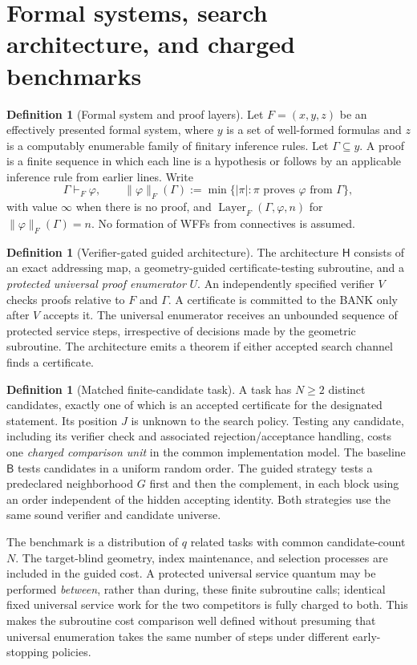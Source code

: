 \documentclass[11pt,letterpaper]{article}
\theoremstyle{definition}
\newtheorem{definition}[theorem]{Definition}
\theoremstyle{remark}
\newcommand{\Layer}{\operatorname{Layer}}
\newcommand{\Hsys}{\mathsf H}
\newcommand{\Bsys}{\mathsf B}
\begin{document}
\section{Formal systems, search architecture, and charged benchmarks}
\begin{definition}[Formal system and proof layers]
Let $F=(x,y,z)$ be an effectively presented formal system, where $y$ is a set of well-formed formulas and $z$ is a computably enumerable family of finitary inference rules. Let $\Gamma\subseteq y$. A proof is a finite sequence in which each line is a hypothesis or follows by an applicable inference rule from earlier lines. Write
\[
 \Gamma\vdash_F\varphi,\qquad
 \|\varphi\|_F(\Gamma):=\min\{|\pi|:\pi\text{ proves }\varphi\text{ from }\Gamma\},
\]
with value $\infty$ when there is no proof, and
$\Layer_F(\Gamma,\varphi,n)$ for $\|\varphi\|_F(\Gamma)=n$.
No formation of WFFs from connectives is assumed.
\end{definition}

\begin{definition}[Verifier-gated guided architecture]
The architecture $\Hsys$ consists of an exact addressing map, a geometry-guided certificate-testing subroutine, and a \emph{protected universal proof enumerator} $U$. An independently specified verifier $V$ checks proofs relative to $F$ and $\Gamma$. A certificate is committed to the BANK only after $V$ accepts it. The universal enumerator receives an unbounded sequence of protected service steps, irrespective of decisions made by the geometric subroutine. The architecture emits a theorem if either accepted search channel finds a certificate.
\end{definition}

\begin{definition}[Matched finite-candidate task]
A task has $N\ge 2$ distinct candidates, exactly one of which is an accepted certificate for the designated statement. Its position $J$ is unknown to the search policy. Testing any candidate, including its verifier check and associated rejection/acceptance handling, costs one \emph{charged comparison unit} in the common implementation model. The baseline $\Bsys$ tests candidates in a uniform random order. The guided strategy tests a predeclared neighborhood $G$ first and then the complement, in each block using an order independent of the hidden accepting identity. Both strategies use the same sound verifier and candidate universe.
\end{definition}

The benchmark is a distribution of $q$ related tasks with common candidate-count $N$. The target-blind geometry, index maintenance, and selection processes are included in the guided cost. A protected universal service quantum may be performed \emph{between}, rather than during, these finite subroutine calls; identical fixed universal service work for the two competitors is fully charged to both. This makes the subroutine cost comparison well defined without presuming that universal enumeration takes the same number of steps under different early-stopping policies.
\end{document}
